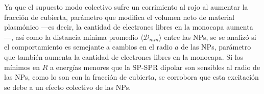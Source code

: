 
 Ya que el supuesto modo colectivo sufre un corrimiento al rojo al aumentar la fracción de cubierta, parámetro que modifica el volumen neto de material plasmónico ---es decir, la cantidad de electrones libres en la monocapa aumenta---, así como la distancia mínima promedio $\langle\mathscr{D}_{min}\rangle$ entre las NPs, se  se analizó si el comportamiento es semejante a cambios en el radio $a$ de las NPs, parámetro que también aumenta la cantidad de electrones libres en la monocapa. Si  los mínimos en $R$  a energías menores que la SP-SPR dipolar son sensibles al radio de las NPs, como lo son con la fracción de cubierta, se corrobora que esta excitación se debe a un efecto colectivo de las NPs.
 
